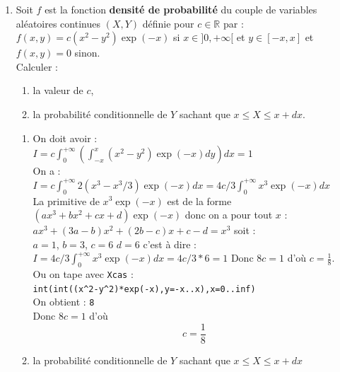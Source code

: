 \documentclass[a4paper,11pt]{book}
\newcommand{\R}{{\mathbb{R}}}
\begin{document}
\begin{enumerate}
\begin{enumerate}
{\bf Calcul de $V(Z3)$ et de $\sigma(Z3)$}\\
On a :\\
$\displaystyle V(Z3)=E(Z3^2)-(E(Z3))^2$\\
$E(Z3^2)=\int_0^{+\infty}z*(-z*exp(-1/z)+z-exp(-1/z))dz$\\
On tape  :\\
{\tt limit(z*(-z*exp(-1/z)+z-exp(-1/z)),z=inf)}\\
On obtient : {\tt 1/2}\\
Donc l'int\'egrale calculant $E(Z3^2)$ diverge donc on ne peut pas calculer la 
variance de $Z3$.
\end{enumerate}
\item Soit  $f$ est la fonction {\bf densit\'e de probabilit\'e} du couple de 
variables al\'eatoires continues $(X,Y)$ d\'efinie pour $c\in \R $ par :\\
$\displaystyle f(x,y)=c(x^2-y^2)\exp(-x)$ si $x\in ]0,+\infty[$ et $y\in [-x,x]$ et$f(x,y)=0$ sinon.\\
Calculer :
\begin{enumerate}
\item
la valeur de $c$,
\item la probabilit\'e conditionnelle de $Y$ sachant que $x\leq X\leq x+dx$.\\
\end{enumerate}
\begin{enumerate}
\item
On doit avoir :\\
$I=\displaystyle c\int_0^{+\infty}(\int_{-x}^x(x^2-y^2)\exp(-x)dy)dx=1$\\
On a :\\
$I=c\int_0^{+\infty}2(x^3-x^3/3)\exp(-x)dx=4c/3\int_0^{+\infty}x^3\exp(-x)dx$\\
La primitive de $x^3\exp(-x)$ est de la forme $(ax^3+bx^2+cx+d)\exp(-x)$ donc 
on a pour tout $x$ :\\
$ax^3+(3a-b)x^2+(2b-c)x+c-d=x^3$
soit :\\
$a=1$, $b=3$, $c=6$ $d=6$ c'est \`a dire :\\
$I=4c/3\int_0^{+\infty}x^3\exp(-x)dx=4c/3*6=1$ 
Donc $8c=1$ d'o\`u $c=\frac{1}{8}$.\\
Ou on tape avec {\tt Xcas} :\\
{\tt int(int((x\verb|^|2-y\verb|^|2)*exp(-x),y=-x..x),x=0..inf)}\\
On obtient : {\tt 8}\\
Donc $8c=1$ d'o\`u 
$$c=\frac{1}{8}$$
\item la probabilit\'e conditionnelle de $Y$ sachant que $x\leq X\leq x+dx$ 

\end{enumerate}
\end{enumerate}
\end{document}
